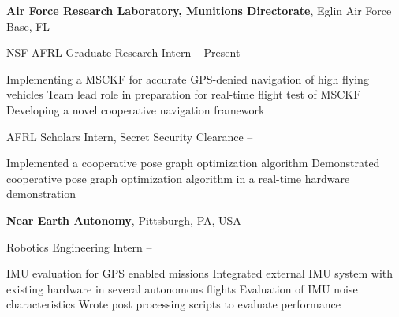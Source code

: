 \documentclass[letterpaper,MMMyyyy,nonstopmode]{simpleresumecv}
\begin{document}
\begin{Body}
\Entry
\textbf{Air Force Research Laboratory, Munitions Directorate},
Eglin Air Force Base, FL

\Gap
\BulletItem
NSF-AFRL Graduate Research Intern
\hfill
{} --
Present
\begin{Detail}
\SubBulletItem
Implementing a MSCKF for accurate GPS-denied navigation of high flying vehicles
\SubBulletItem
Team lead role in preparation for real-time flight test of MSCKF
\SubBulletItem
Developing a novel cooperative navigation framework
\end{Detail}

\Gap
\BulletItem
AFRL Scholars Intern, Secret Security Clearance
\hfill
{}--
\begin{Detail}
\SubBulletItem
Implemented a cooperative pose graph optimization algorithm
\SubBulletItem
Demonstrated cooperative pose graph optimization algorithm in a real-time hardware demonstration
\end{Detail}


\Gap
\Entry
\textbf{Near Earth Autonomy},
Pittsburgh, PA, USA

\Gap
\BulletItem
Robotics Engineering Intern
\hfill
{} --
\begin{Detail}
\SubBulletItem
IMU evaluation for GPS enabled missions
\SubBulletItem
Integrated external IMU system with existing hardware in several autonomous flights
\SubBulletItem
Evaluation of IMU noise characteristics
\SubBulletItem
Wrote post processing scripts to evaluate performance
\end{Detail}





\end{Body}
\end{document}
